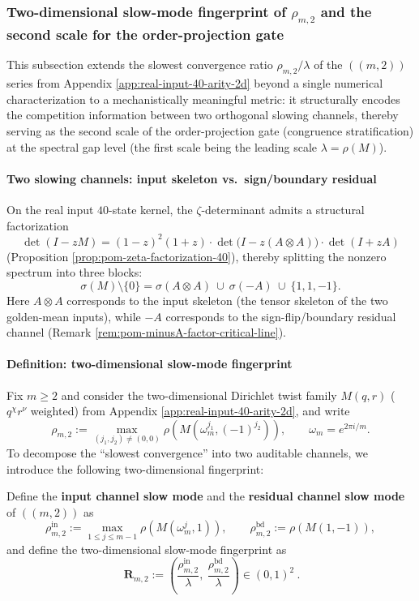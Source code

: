 \subsubsection{Two-dimensional slow-mode fingerprint of \texorpdfstring{$\rho_{m,2}$}{rho(m,2)} and the second scale for the order-projection gate}\label{subsec:rho-m2-2d-fingerprint}
This subsection extends the slowest convergence ratio
\(\rho_{m,2}/\lambda\) of the \(((m,2))\) series from Appendix \ref{app:real-input-40-arity-2d} beyond a single numerical characterization to a mechanistically meaningful metric: it structurally encodes the competition information between two orthogonal slowing channels,
thereby serving as the second scale of the order-projection gate (congruence stratification) at the spectral gap level (the first scale being the leading scale \(\lambda=\rho(M)\)).

\paragraph{Two slowing channels: input skeleton vs.\ sign/boundary residual}
On the real input \(40\)-state kernel, the \(\zeta\)-determinant admits a structural factorization
\[
\det(I-zM)=(1-z)^2(1+z)\cdot \det\!\bigl(I-z(A\otimes A)\bigr)\cdot \det(I+zA)
\]
(Proposition \ref{prop:pom-zeta-factorization-40}), thereby splitting the nonzero spectrum into three blocks:
\[
\sigma(M)\setminus\{0\}=\sigma(A\otimes A)\ \cup\ \sigma(-A)\ \cup\ \{1,1,-1\}.
\]
Here \(A\otimes A\) corresponds to the input skeleton (the tensor skeleton of the two golden-mean inputs), while \(-A\) corresponds to the sign-flip/boundary residual channel (Remark \ref{rem:pom-minusA-factor-critical-line}).

\paragraph{Definition: two-dimensional slow-mode fingerprint}
Fix \(m\ge 2\) and consider the two-dimensional Dirichlet twist family \(M(q,r)\) (\(q^\chi r^\nu\) weighted) from Appendix \ref{app:real-input-40-arity-2d}, and write
\[
\rho_{m,2}:=\max_{(j_1,j_2)\neq(0,0)}\rho\!\left(M(\omega_m^{j_1},(-1)^{j_2})\right),
\qquad \omega_m=e^{2\pi i/m}.
\]
To decompose the ``slowest convergence'' into two auditable channels, we introduce the following two-dimensional fingerprint:
\begin{definition}\label{def:rho-m2-fingerprint}
Define the \textbf{input channel slow mode} and the \textbf{residual channel slow mode} of \(((m,2))\) as
\[
\rho^{\mathrm{in}}_{m,2}:=\max_{1\le j\le m-1}\rho\!\left(M(\omega_m^{j},1)\right),
\qquad
\rho^{\mathrm{bd}}_{m,2}:=\rho\!\left(M(1,-1)\right),
\]
and define the two-dimensional slow-mode fingerprint as
\[
\boxed{\ \mathbf{R}_{m,2}:=\left(\frac{\rho^{\mathrm{in}}_{m,2}}{\lambda},\ \frac{\rho^{\mathrm{bd}}_{m,2}}{\lambda}\right)\in(0,1)^2\ }.
\]
\end{definition}


